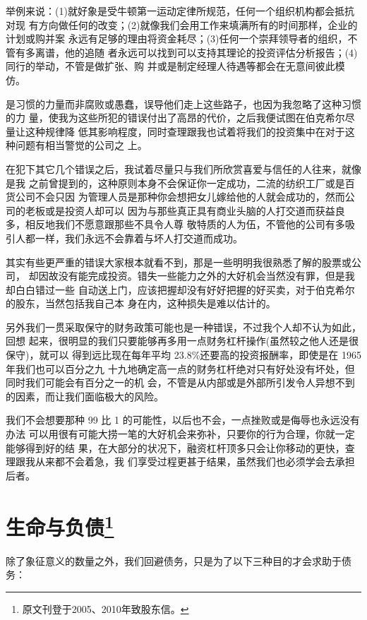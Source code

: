 \documentclass[UTF8,a4paper,zihao=-4,fontset = windows]{ctexart} %
\begin{document}
举例来说：(1)就好象是受牛顿第一运动定律所规范，任何一个组织机构都会抵抗对现
有方向做任何的改变；(2)就像我们会用工作来填满所有的时间那样，企业的计划或购并案
永远有足够的理由将资金耗尽；(3)任何一个崇拜领导者的组织，不管有多离谱，他的追随
者永远可以找到可以支持其理论的投资评估分析报告；(4)同行的举动，不管是做扩张、购
并或是制定经理人待遇等都会在无意间彼此模仿。

是习惯的力量而非腐败或愚蠢，误导他们走上这些路子，也因为我忽略了这种习惯的力
量，使我为这些所犯的错误付出了高昂的代价，之后我便试图在伯克希尔尽量让这种规律降
低其影响程度，同时查理跟我也试着将我们的投资集中在对于这种问题有相当警觉的公司之
上。

在犯下其它几个错误之后，我试着尽量只与我们所欣赏喜爱与信任的人往来，就像是我
之前曾提到的，这种原则本身不会保证你一定成功，二流的纺织工厂或是百货公司不会只因
为管理人员是那种你会想把女儿嫁给他的人就会成功的，然而公司的老板或是投资人却可以
因为与那些真正具有商业头脑的人打交道而获益良多，相反地我们不愿意跟那些不具令人尊
敬特质的人为伍，不管他的公司有多吸引人都一样，我们永远不会靠着与坏人打交道而成功。

其实有些更严重的错误大家根本就看不到，那是一些明明我很熟悉了解的股票或公司，
却因故没有能完成投资。错失一些能力之外的大好机会当然没有罪，但是我却白白错过一些
自动送上门，应该把握却没有好好把握的好买卖，对于伯克希尔的股东，当然包括我自己本
身在内，这种损失是难以估计的。

另外我们一贯采取保守的财务政策可能也是一种错误，不过我个人却不认为如此，回想
起来，很明显的我们只要能够再多用一点财务杠杆操作(虽然较之他人还是很保守)，就可以
得到远比现在每年平均 23.8\%还要高的投资报酬率，即使是在 1965 年我们也可以百分之九
十九地确定高一点的财务杠杆绝对只有好处没有坏处，但同时我们可能会有百分之一的机
会，不管是从内部或是外部所引发令人异想不到的因素，而让我们面临极大的风险。

我们不会想要那种 99 比 1 的可能性，以后也不会，一点挫败或是侮辱也永远没有办法
可以用很有可能大捞一笔的大好机会来弥补，只要你的行为合理，你就一定能够得到好的结
果，在大部分的状况下，融资杠杆顶多只会让你移动的更快，查理跟我从来都不会着急，我
们享受过程更甚于结果，虽然我们也必须学会去承担后者。

\section[生命与负债]{生命与负债\footnote{原文刊登于2005、2010年致股东信。}}

除了象征意义的数量之外，我们回避债务，只是为了以下三种目的才会求助于债务：
\end{document}
